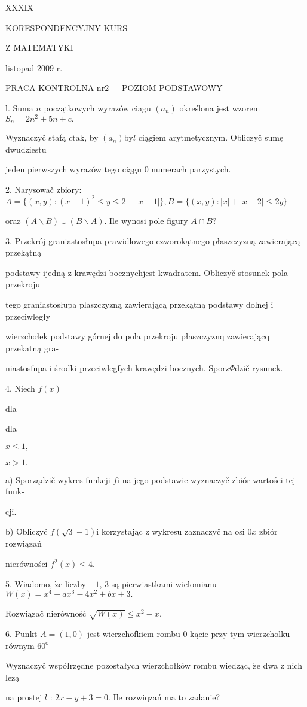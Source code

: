 \documentclass[a4paper,12pt]{article}
\begin{document}
XXXIX

KORESPONDENCYJNY KURS

Z MATEMATYKI

listopad 2009 r.

PRACA KONTROLNA $\mathrm{n}\mathrm{r} 2-$ POZIOM PODSTAWOWY

l. Suma $n$ początkowych wyrazów ciagu $(a_{n})$ określona jest wzorem $S_{n} =2n^{2}+5n+c.$

Wyznaczyč stafą $c\mathrm{t}\mathrm{a}\mathrm{k}$, by $(a_{n})\mathrm{b}\mathrm{y}l$ ciągiem arytmetycznym. Obliczyč sumę dwudziestu

jeden pierwszych wyrazów tego ciągu $0$ numerach parzystych.

2. Narysowač zbiory: $A=\{(x,y):(x-1)^{2}\leq y\leq 2-|x-1|\}, B=\{(x,y):|x|+|x-2|\leq 2y\}$

oraz $(A\backslash B)\cup(B\backslash A)$. Ile wynosi pole figury $A\cap B$?

3. Przekrój graniastosłupa prawidlowego czworokątnego płaszczyzną zawierającą przekątną

podstawy ijedną $\mathrm{z}$ krawędzi bocznychjest kwadratem. Obliczyč stosunek pola przekroju

tego graniastosłupa plaszczyzną zawierającą przekątną podstawy dolnej $\mathrm{i}$ przeciwległy

wierzchołek podstawy górnej do pola przekroju płaszczyznq zawierającq przekatną gra-

niastosfupa $\mathrm{i}$ środki przeciwlegfych krawędzi bocznych. Sporz$\Phi$dzič rysunek.

4. Niech $f(x)=$

dla

dla

$x\leq 1,$

$x>1.$

a) Sporządzič wykres funkcji $f\mathrm{i}$ na jego podstawie wyznaczyč zbiór wartości tej funk-

cji.

b) Obliczyč $f(\sqrt{3}-1) \mathrm{i}$ korzystając $\mathrm{z}$ wykresu zaznaczyč na osi $0x$ zbiór rozwiązań

nierówności $f^{2}(x)\leq 4.$

5. Wiadomo, $\dot{\mathrm{z}}\mathrm{e}$ liczby $-1$, 3 są pierwiastkami wielomianu $W(x)=x^{4}-ax^{3}-4x^{2}+bx+3.$

Rozwiązač nierównośč $\sqrt{W(x)}\leq x^{2}-x.$

6. Punkt $A=(1,0)$ jest wierzchofkiem rombu $0$ kącie przy tym wierzcholku równym $60^{\mathrm{o}}$

Wyznaczyč współrzędne pozostałych wierzchołków rombu wiedząc, $\dot{\mathrm{z}}\mathrm{e}$ dwa $\mathrm{z}$ nich lezą

na prostej $l$ : $2x-y+3=0$. Ile rozwiqzań ma to zadanie?
\end{document}
